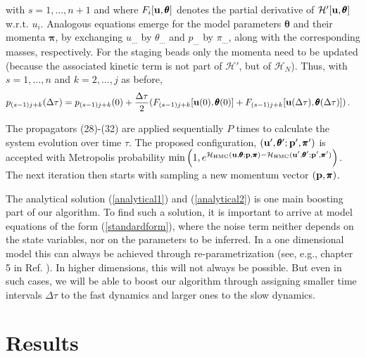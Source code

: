 \documentclass[11pt]{article}
\newcommand{\vc}[1]{{\bf #1 }}
\theoremstyle{definition}
\newcommand{\bt}{\pmb\theta}
\begin{document}
with $s=1,\dots,n+1$ and where $F_i[\vc u,{\pmb\theta}]$ denotes the partial derivative of $\mathcal H'[\vc u,{\pmb\theta}]$ w.r.t. $u_i$.
Analogous equations emerge for the model parameters $\bt$ and their momenta ${\pmb\pi}$, by exchanging $u_{…}$ by $\theta_{…}$ and $p_{…}$ by $\pi_{…}$, along with the corresponding masses, respectively.
For the staging beads
only the momenta need to be updated (because the associated kinetic term is not part of $\mathcal H'$, but of $\mathcal H_N$).
Thus, with $s=1,\dots,n$ and $k=2,\dots,j$ as before,
\begin{align}
  p_{(s-1)j+k}(\Delta\tau)
  &=
  p_{(s-1)j+k}(0)
  +
  \frac{\Delta\tau}{2}
  (
  F_{(s-1)j+k}[\vc u(0),{\pmb\theta}(0)]
  +
  F_{(s-1)j+k}[\vc u(\Delta\tau),{\pmb\theta}(\Delta\tau)]
  )
  \,.
\end{align}

The propagators (28)-(32) are applied sequentially $P$ times to calculate the system evolution over time $\tau$. The proposed configuration, $(\vc u',\bt';\vc p',{\pmb\pi}')$ is accepted with Metropolis probability $  \min
  \left(
    1,
    e^{\mathcal{H}_{\mbox{\tiny HMC}}(\vc u,\bt;\vc p,{\pmb\pi}) - \mathcal{H}_{\mbox{\tiny HMC}}(\vc u',\bt';\vc p',{\pmb\pi}')}
  \right)$.
The next iteration then starts with sampling a new momentum vector $(\vc p,{\pmb\pi})$.

The analytical solution (\ref{analytical1}) and (\ref{analytical2}) is one main boosting part of our algorithm.
To find such a solution, it is important to arrive at model equations of the form (\ref{standardform}), where the noise term neither depends on the state variables, nor on the parameters to be inferred.
In a one dimensional model this can always be achieved through re-parametrization (see, e.g., chapter 5 in Ref. \cite{risken_1989_FockerPlanck}).
In higher dimensions, this will not always be possible. But even in such cases, we will be able to boost our algorithm through assigning smaller time intervals $\Delta\tau$ to the fast dynamics and larger ones to the slow dynamics.


\section{Results}\label{numerical_results}
\end{document}
